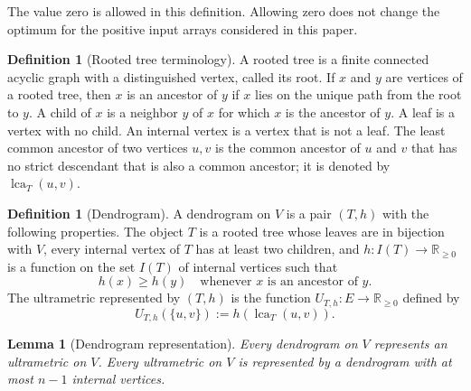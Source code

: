 \documentclass[11pt]{article}
\newtheorem{lemma}[theorem]{Lemma}
\theoremstyle{definition}
\newtheorem{definition}[theorem]{Definition}
\newcommand{\R}{\mathbb{R}}
\newcommand{\lca}{\operatorname{lca}}
\begin{document}
The value zero is allowed in this definition.  Allowing zero does not change
the optimum for the positive input arrays considered in this paper.

\begin{definition}[Rooted tree terminology]
A rooted tree is a finite connected acyclic graph with a distinguished vertex,
called its root.  If \(x\) and \(y\) are vertices of a rooted tree, then \(x\)
is an ancestor of \(y\) if \(x\) lies on the unique path from the root to
\(y\).  A child of \(x\) is a neighbor \(y\) of \(x\) for which \(x\) is the
ancestor of \(y\).  A leaf is a vertex with no child.  An internal vertex is a
vertex that is not a leaf.  The least common ancestor of two vertices \(u,v\)
is the common ancestor of \(u\) and \(v\) that has no strict descendant that
is also a common ancestor; it is denoted by \(\lca_T(u,v)\).
\end{definition}

\begin{definition}[Dendrogram]
A dendrogram on \(V\) is a pair \((T,h)\) with the following properties.
The object \(T\) is a rooted tree whose leaves are in bijection with \(V\),
every internal vertex of \(T\) has at least two children, and
\(h:I(T)\to\R_{\ge0}\) is a function on the set \(I(T)\) of internal vertices
such that
\[
 h(x)\ge h(y)
 \quad\text{whenever \(x\) is an ancestor of \(y\).}
\]
The ultrametric represented by \((T,h)\) is the function
\(U_{T,h}:E\to\R_{\ge0}\) defined by
\[
 U_{T,h}(\{u,v\}):=h(\lca_T(u,v)).
\]
\end{definition}

\begin{lemma}[Dendrogram representation]\label{lem:dendrogram-representation}
Every dendrogram on \(V\) represents an ultrametric on \(V\).  Every
ultrametric on \(V\) is represented by a dendrogram with at most \(n-1\)
internal vertices.
\end{lemma}
\end{document}
